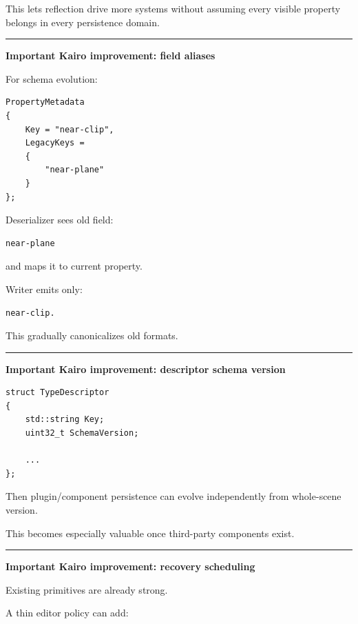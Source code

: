 This lets reflection drive more systems without assuming every visible property belongs in every persistence domain.

\begin{center}\rule{0.5\linewidth}{0.5pt}\end{center}

\textbf{Important Kairo improvement: field aliases}

For schema evolution:

\begin{verbatim}
PropertyMetadata
{
    Key = "near-clip",
    LegacyKeys =
    {
        "near-plane"
    }
};
\end{verbatim}

Deserializer sees old field:

\begin{verbatim}
near-plane
\end{verbatim}

and maps it to current property.

Writer emits only:

\begin{verbatim}
near-clip.
\end{verbatim}

This gradually canonicalizes old formats.

\begin{center}\rule{0.5\linewidth}{0.5pt}\end{center}

\textbf{Important Kairo improvement: descriptor schema version}

\begin{verbatim}
struct TypeDescriptor
{
    std::string Key;
    uint32_t SchemaVersion;

    ...
};
\end{verbatim}

Then plugin/component persistence can evolve independently from whole-scene version.

This becomes especially valuable once third-party components exist.

\begin{center}\rule{0.5\linewidth}{0.5pt}\end{center}

\textbf{Important Kairo improvement: recovery scheduling}

Existing primitives are already strong.

A thin editor policy can add:


